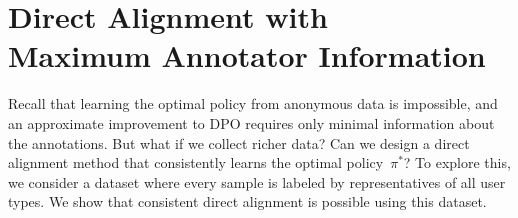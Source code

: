 \section{Direct Alignment with \ifnotarxiv \\ \fi Maximum Annotator Information}
\label{sec:dpo_with_known_u}

Recall that learning the optimal policy from anonymous data is impossible, and an approximate improvement to DPO requires only minimal information about the annotations. But what if we collect richer data? Can we design a direct alignment method that consistently learns the optimal policy~$\pi^*$? To explore this, we consider a dataset where every sample is labeled by representatives of all user types. We show that consistent direct alignment is possible using this dataset. 

